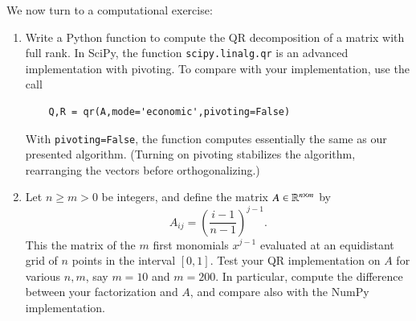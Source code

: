 \documentclass[12pt]{report}
\begin{document}
We now turn to a computational exercise:
\begin{enumerate}[resume]
\item Write a Python function to compute the QR decomposition of a matrix with full rank. In SciPy, the function \texttt{scipy.linalg.qr} is an advanced implementation with pivoting. To compare with your implementation, use the call
\begin{verbatim}
    Q,R = qr(A,mode='economic',pivoting=False)
\end{verbatim}
With \texttt{pivoting=False}, the function computes essentially the same as our presented algorithm. (Turning on pivoting stabilizes the algorithm, rearranging the vectors before orthogonalizing.)
\item Let $n\geq m>0$ be integers, and define the matrix $A\in \mathbb{R}^{n\times m}$ by
\begin{equation}
    A_{ij} = \left(\frac{i-1}{n-1}\right)^{j-1}.
\end{equation}
This the matrix of the $m$ first monomials $x^{j-1}$ evaluated at an equidistant grid of $n$ points in the interval $[0,1]$.
Test your QR implementation on $A$ for various $n,m$, say $m=10$ and $m=200$. In particular, compute the difference between your factorization and $A$, and compare also with the NumPy implementation.
\end{enumerate}



\end{document}
